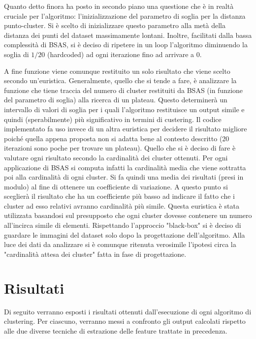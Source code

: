 \documentclass[]{report}
\begin{document}
	Quanto detto finora ha posto in secondo piano una questione che è in realtà cruciale per l'algoritmo: l'inizializzazione del parametro di soglia per la distanza punto-cluster. Si è scelto di inizializzare questo parametro alla metà della distanza dei punti del dataset massimamente lontani. Inoltre, facilitati dalla bassa complessità di BSAS, si è deciso di ripetere in un loop l'algoritmo diminuendo la soglia di $1/20$ (hardcoded) ad ogni iterazione fino ad arrivare a 0.
	
	 A fine funzione viene comunque restituito un solo risultato che viene scelto secondo un'euristica. Generalmente, quello che si tende a fare, è analizzare la funzione che tiene traccia del numero di cluster restituiti da BSAS (in funzione del parametro di soglia) alla ricerca di un plateau. Questo determinerà un intervallo di valori di soglia per i quali l'algoritmo restituisce un output simile e quindi (sperabilmente) più significativo in termini di custering. Il codice implementato fa uso invece di un altra euristica per decidere il risultato migliore poiché quella appena proposta non si adatta bene al contesto descritto (20 iterazioni sono poche per trovare un plateau). Quello che si è deciso di fare è valutare ogni risultato secondo la cardinalità dei cluster ottenuti. Per ogni applicazione di BSAS si computa infatti la cardinalità media che viene sottratta poi alla cardinalità di ogni cluster. Si fa quindi una media dei risultati (presi in modulo) al fine di ottenere un coefficiente di variazione. A questo punto si sceglierà il risultato che ha un coefficiente più basso ad indicare il fatto che i cluster ad esso relativi avranno cardinalità più simile. Questa euristica è stata utilizzata basandosi sul presupposto che ogni cluster dovesse contenere un numero all'incirca simile di elementi. Rispettando l'approccio "black-box" si è deciso di guardare le immagini del dataset solo dopo la progettazione dell'algoritmo. Alla luce dei dati da analizzare si è comunque ritenuta verosimile l'ipotesi circa la "cardinalità attesa dei cluster" fatta in fase di progettazione.   


\chapter*{\huge Risultati}

	Di seguito verranno esposti i risultati ottenuti dall'esecuzione di ogni algoritmo di clustering. Per ciascuno, verranno messi a confronto gli output calcolati rispetto alle due diverse tecniche di estrazione delle feature trattate in precedenza. 
	
\end{document}
